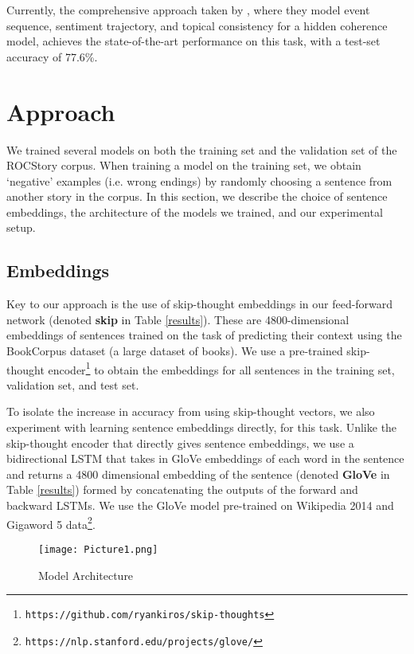 \documentclass[11pt,a4paper]{article}
\begin{document}
Currently, the comprehensive approach taken by \citet{Chaturvedi2017StoryCF}, where they model event sequence, sentiment trajectory, and topical consistency for a hidden coherence model,  achieves the state-of-the-art performance on this task, with a test-set accuracy of 77.6\%.

\section{Approach}

We trained several models on both the training set and the validation set of the ROCStory corpus. When training a model on the training set, we obtain `negative' examples (i.e. wrong endings) by randomly choosing a sentence from another story in the corpus. In this section, we describe the choice of sentence embeddings, the architecture of the models we trained, and our experimental setup.

\subsection{Embeddings}

Key to our approach is the use of skip-thought embeddings \citep{kiros2015skip} in our feed-forward network (denoted {\bf skip} in Table \ref{results}). These are 4800-dimensional embeddings of sentences trained on the task of predicting their context using the BookCorpus dataset (a large dataset of books). We use a pre-trained skip-thought encoder\footnote{\texttt{https://github.com/ryankiros/skip-thoughts}} to obtain the embeddings for all sentences in the training set, validation set, and test set.

To isolate the increase in accuracy from using skip-thought vectors, we also experiment with learning sentence embeddings directly, for this task. Unlike the skip-thought encoder that directly gives sentence embeddings, we use a bidirectional LSTM that takes in GloVe embeddings \citep{pennington2014glove} of each word in the sentence and returns a 4800 dimensional embedding of the sentence (denoted {\bf GloVe} in Table \ref{results}) formed by concatenating the outputs of the forward and backward LSTMs. We use the GloVe model pre-trained on Wikipedia 2014 and Gigaword 5 data\footnote{\texttt{https://nlp.stanford.edu/projects/glove/}}.

\begin{figure*}
\begin{center}
\texttt{[image: Picture1.png]}\caption{Model Architecture}
\end{center}
\end{figure*}
\end{document}
